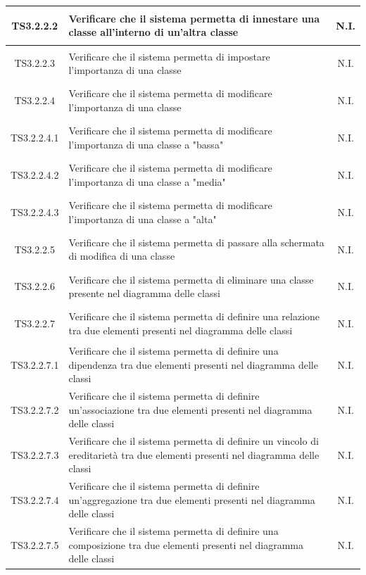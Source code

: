 \documentclass[../PianoDiQualifica.tex]{subfiles}
\begin{document}
\begin{longtable}{|c|>{\centering}p{10cm}|c|}
	\hline
	\hypertarget{TS3.2.2.2}{TS3.2.2.2} & Verificare che il sistema permetta di innestare una classe all'interno di un'altra classe & N.I. \\
	\hline
	\hypertarget{TS3.2.2.3}{TS3.2.2.3} & Verificare che il sistema permetta di impostare l'importanza di una classe & N.I. \\
	\hline
	\hypertarget{TS3.2.2.4}{TS3.2.2.4} & Verificare che il sistema permetta di modificare l'importanza di una classe & N.I. \\
	\hline
	\hypertarget{TS3.2.2.4.1}{TS3.2.2.4.1} & Verificare che il sistema permetta di modificare l'importanza di una classe a "bassa" & N.I. \\
	\hline
	\hypertarget{TS3.2.2.4.2}{TS3.2.2.4.2} & Verificare che il sistema permetta di modificare l'importanza di una classe a "media" & N.I. \\
	\hline
	\hypertarget{TS3.2.2.4.3}{TS3.2.2.4.3} & Verificare che il sistema permetta di modificare l'importanza di una classe a "alta" & N.I. \\
	\hline
	\hypertarget{TS3.2.2.5}{TS3.2.2.5} & Verificare che il sistema permetta di passare alla schermata di modifica di una classe & N.I. \\
	\hline
	\hypertarget{TS3.2.2.6}{TS3.2.2.6} & Verificare che il sistema permetta di eliminare una classe presente nel diagramma delle classi & N.I. \\
	\hline
	\hypertarget{TS3.2.2.7}{TS3.2.2.7} & Verificare che il sistema permetta di definire una relazione tra due elementi presenti nel diagramma delle classi & N.I. \\
	\hline
	\hypertarget{TS3.2.2.7.1}{TS3.2.2.7.1} & Verificare che il sistema permetta di definire una dipendenza tra due elementi presenti nel diagramma delle classi & N.I. \\
	\hline
	\hypertarget{TS3.2.2.7.2}{TS3.2.2.7.2} & Verificare che il sistema permetta di definire un'associazione tra due elementi presenti nel diagramma delle classi & N.I. \\
	\hline
	\hypertarget{TS3.2.2.7.3}{TS3.2.2.7.3} & Verificare che il sistema permetta di definire un vincolo di ereditarietà tra due elementi presenti nel diagramma delle classi & N.I. \\
	\hline
	\hypertarget{TS3.2.2.7.4}{TS3.2.2.7.4} & Verificare che il sistema permetta di definire un'aggregazione tra due elementi presenti nel diagramma delle classi & N.I. \\
	\hline
	\hypertarget{TS3.2.2.7.5}{TS3.2.2.7.5} & Verificare che il sistema permetta di definire una composizione tra due elementi presenti nel diagramma delle classi & N.I. \\

\end{longtable}
\end{document}
